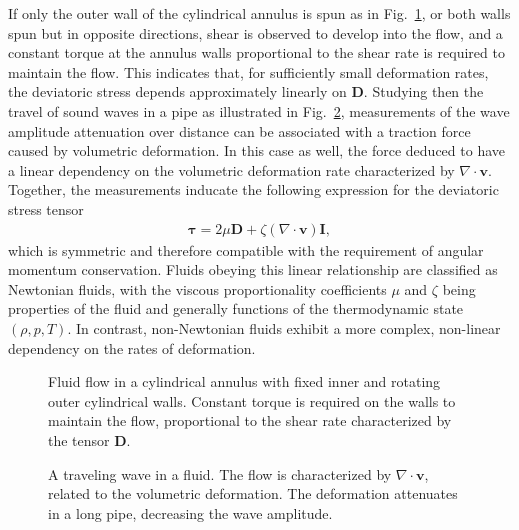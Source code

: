If only the outer wall of the cylindrical annulus is spun as in Fig.~\ref{fig:cylinder-flow-shear}, or both walls spun but in opposite directions, shear is observed to develop into the flow, and a constant torque at the annulus walls proportional to the shear rate is required to maintain the flow. This indicates that, for sufficiently small deformation rates, the deviatoric stress depends approximately linearly on $\bm{D}$. Studying then the travel of sound waves in a pipe as illustrated in Fig.~\ref{fig:pipe-wave}, measurements of the wave amplitude attenuation over distance can be associated with a traction force caused by volumetric deformation. In this case as well, the force deduced to have a linear dependency on the volumetric deformation rate characterized by $\nabla\cdot\bm{v}$. Together, the measurements inducate the following expression for the deviatoric stress tensor
\begin{align}\label{eq:deviatoric-stress}
    \bm{\tau} = 2\mu \bm{D} + \zeta(\nabla \cdot \bm{v})\bm{I},
\end{align}
which is symmetric and therefore compatible with the requirement of angular momentum conservation. Fluids obeying this linear relationship are classified as Newtonian fluids, with the viscous proportionality coefficients $\mu$ and $\zeta$ being properties of the fluid and generally functions of the thermodynamic state $(\rho, p, T)$. In contrast, non-Newtonian fluids exhibit a more complex, non-linear dependency on the rates of deformation.
\begin{figure}[!htb]
    \centering
    
    \caption{Fluid flow in a cylindrical annulus with fixed inner and rotating outer cylindrical walls. Constant torque is required on the walls to maintain the flow, proportional to the shear rate characterized by the tensor $\bm{D}$.}
    \label{fig:cylinder-flow-shear}
\end{figure}
\begin{figure}[!htb]
    \centering
    
    \caption{A traveling wave in a fluid. The flow is characterized by $\nabla\cdot\bm{v}$, related to the volumetric deformation. The deformation attenuates in a long pipe, decreasing the wave amplitude.}
    \label{fig:pipe-wave}
\end{figure}

